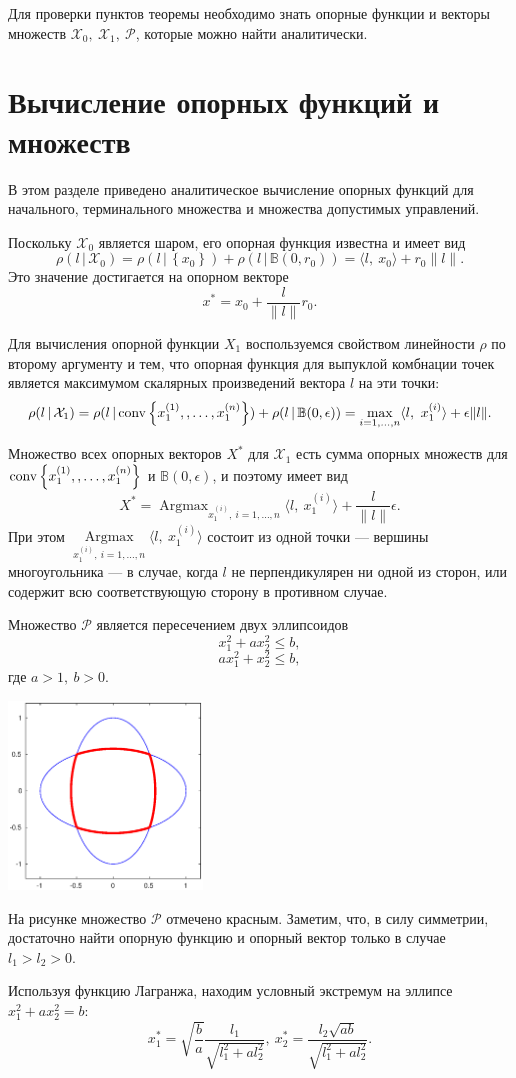 \documentclass[11pt]{article}
\newcommand\PS{\mathcal{P}}
\newcommand\X{\mathcal{X}}
\newcommand\Sup[2]{\rho( #1 \, | \, #2 )}
\newcommand\Conv[1]{{\rm conv}\left\{ #1 \right\}}
\DeclareMathOperator*{\Argmax}{Argmax}
\begin{document}
Для проверки пунктов теоремы необходимо знать опорные функции и векторы множеств $\X_0, \ \X_1, \ \PS$, 
которые можно найти аналитически.

\newpage
\section{Вычисление опорных функций и множеств}
В этом разделе приведено аналитическое вычисление опорных функций для начального, терминального множества и множества допустимых управлений.

Поскольку $\X_0$ является шаром, его опорная функция известна и имеет вид
$$\Sup{l}{\X_0} = \Sup{l}{\left\{x_0\right\}} + \Sup{l}{\mathbb{B}(0, r_0)} = 
\langle l, \ x_0 \rangle + r_0\|l\|.$$
Это значение достигается на опорном векторе 
$$x^* = x_0 + \frac{l}{\|l\|}r_0.$$

Для вычисления опорной функции $X_1$ воспользуемся свойством линейности $\rho$ по второму аргументу и 
тем, что опорная функция для выпуклой комбнации точек является максимумом скалярных произведений
вектора $l$ на эти точки:
$$\Sup{l}{\X_1} = \Sup{l}{\Conv{x_1^{\left(1\right)},, \ldots, x_1^{\left(n\right)}}} + \Sup{l}{\mathbb{B}(0, \epsilon)} =
\max_{i = 1,\ldots,n} \langle l, \ x_1^{\left(i\right)} \rangle + \epsilon \|l\|.$$

Множество всех опорных векторов $X^*$ для $\X_1$ есть сумма опорных множеств для 
$\Conv{x_1^{\left(1\right)},, \ldots, x_1^{\left(n\right)}}$ и $\mathbb{B}(0, \epsilon)$, и поэтому
имеет вид
$$ X^* = \Argmax_{x_1^{\left(i\right)}, \ i = 1, \ldots, n} \langle l, \ x_1^{\left(i\right)}\rangle + \frac{l}{\|l\|
}\epsilon.$$
При этом $\Argmax\limits_{x_1^{\left(i\right)}, \ i = 1, \ldots, n} \langle l, \ x_1^{\left(i\right)}\rangle$ состоит из одной точки
--- вершины многоугольника --- в случае, когда $l$ не перпендикулярен ни одной из сторон, или 
содержит всю соответствующую сторону в противном случае.

Множество $\PS$ является пересечением двух эллипсоидов \\
$$x_1^2 + a x_2^2 \leq b,$$
$$ax_1^2 + x_2^2 \leq b,$$
где $a > 1, \ b > 0$. \\

\noindent
\parbox[b][5cm][t]{50mm}{\includegraphics[height=50mm]{P_set.eps}}
\hfill
\parbox[b][5cm][t]{90mm}{
На рисунке множество $\PS$ отмечено красным. Заметим, что, в силу симметрии, достаточно найти опорную
функцию и опорный вектор только в случае $l_1 > l_2 > 0$.

Используя функцию Лагранжа, находим условный экстремум на эллипсе $x_1^2 + a x_2^2 = b$:
$$x_1^* = \sqrt{\frac{b}{a}}\frac{l_1}{\sqrt{l_1^2+al_2^2}}, \ x_2^* = \frac{l_2\sqrt{ab}}{\sqrt{l_1^2+al_2^2}}.$$
}
\end{document}
